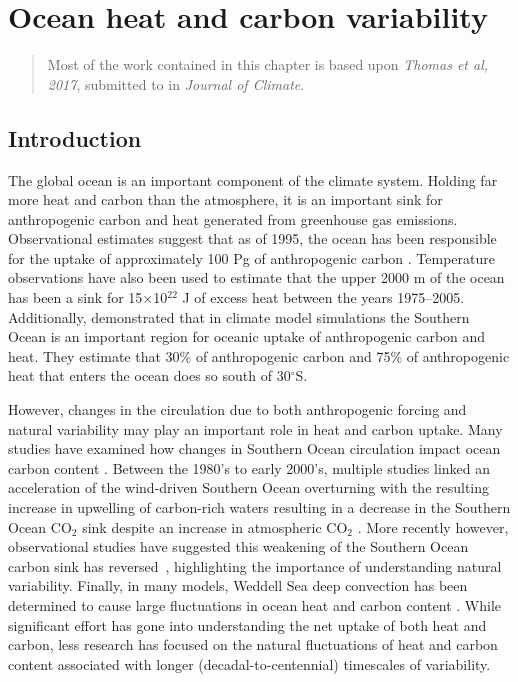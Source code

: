 \graphicspath{{figures/chapter-ocean-heat-carbon/}} %

\chapter{Ocean heat and carbon variability}
\label{cha:ocean_heat_carbon}

\begin{quotation}
  Most of the work contained in this chapter is based upon \textit{Thomas et al, 2017},
  submitted to in \emph{Journal of Climate}.
\end{quotation}

\section{Introduction}
The global ocean is an important component of the climate system. Holding far more
heat and carbon than the atmosphere, it is an
important sink for anthropogenic carbon and heat generated from greenhouse gas
emissions. Observational estimates suggest that as of 1995, the ocean has been
responsible for the uptake of approximately 100 Pg of anthropogenic carbon
\citep{Khatiwala2012,Sabine2004,Waugh2006}. Temperature observations have also
been used to estimate that the upper 2000 m of the ocean has been a sink for
15$\times$10$^{\mathrm{22}}$ J of excess heat \citep{Levitus2009} between the
years 1975--2005. Additionally, \citet{Frolicher2015} demonstrated that in
climate model simulations the Southern Ocean is an important region for oceanic
uptake of anthropogenic carbon and heat. They estimate that 30\% of
anthropogenic carbon and 75\% of anthropogenic heat that enters the ocean does
so south of 30$^{\circ}$S.

However, changes in the circulation due to both anthropogenic forcing and
natural variability may play an important role in heat and carbon uptake. Many
studies have examined how changes in Southern Ocean circulation impact ocean
carbon content \citep{Sarmiento1984,Sarmiento1996,Marinov2008}. Between the
1980's to early 2000's, multiple studies linked an acceleration of the
wind-driven Southern Ocean overturning with the resulting increase in upwelling
of carbon-rich waters resulting in a decrease in the Southern Ocean
CO$_{\mathrm{2}}$ sink despite an increase in atmospheric CO$_2$
\citep{LeQuere2000h,Lovenduski2007,Lenton2009}. More recently however,
observational studies have suggested this weakening of the Southern Ocean carbon
sink has reversed~\citep{Landsch2015,Devries2017}, highlighting the importance
of understanding natural variability.
Finally, in many models, Weddell Sea deep convection has been
determined to cause large fluctuations in ocean heat \citep{Latif2013,
DeLavergne2014a} and carbon content \citep{Bernardello2014}. While significant
effort has gone into understanding the net uptake of both heat and carbon, less
research has focused on the natural fluctuations of heat and carbon content
associated with longer (decadal-to-centennial) timescales of variability.


